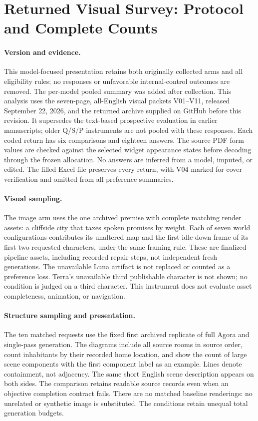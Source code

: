 \section{Returned Visual Survey: Protocol and Complete Counts}
\label{app:human}

\paragraph{Version and evidence.}
This model-focused presentation retains both originally collected arms and
all eligibility rules; no responses or unfavorable internal-control outcomes
are removed. The per-model pooled summary was added after collection.
This analysis uses the seven-page, all-English visual packets V01--V11,
released September 22, 2026, and the returned archive supplied on GitHub before
this revision. It supersedes the text-based prospective evaluation in earlier
manuscripts; older Q/S/P instruments are not pooled with these responses.
Each coded return has six comparisons and eighteen answers. The source PDF
form values are checked against the selected widget appearance states before
decoding through the frozen allocation. No answers are inferred from a model,
imputed, or edited. The filled Excel file preserves every return, with V04
marked for cover verification and omitted from all preference summaries.

\paragraph{Visual sampling.}
The image arm uses the one archived premise with complete matching render
assets: a cliffside city that taxes spoken promises by weight. Each of seven
world configurations contributes its unaltered map and the first idle-down
frame of its first two requested characters, under the same framing rule.
These are finalized pipeline assets, including recorded repair steps, not
independent fresh generations. The unavailable Luna artifact is not replaced
or counted as a preference loss. Terra's unavailable third publishable
character is not shown; no condition is judged on a third character. This
instrument does not evaluate asset completeness, animation, or navigation.

\paragraph{Structure sampling and presentation.}
The ten matched requests use the fixed first archived replicate of full
Agora and single-pass generation. The diagrams include all source rooms in
source order, count inhabitants by their recorded home location, and show
the count of large scene components with the first component label as an
example. Lines denote containment, not adjacency. The same short English
scene description appears on both sides. The comparison retains readable
source records even when an objective completion contract fails. There are
no matched baseline renderings: no unrelated or synthetic image is substituted.
The conditions retain unequal total generation budgets.

